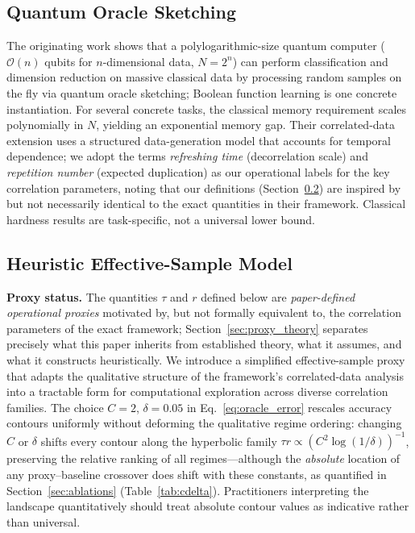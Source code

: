 \documentclass[sensors,article,submit,pdftex,moreauthors]{Definitions/mdpi}
\newcommand{\bigO}{\mathcal{O}}
\providecommand{\DIFadd}[1]{{\protect\color{blue}#1}} %
\providecommand{\DIFdel}[1]{} %
\providecommand{\DIFaddbegin}{} %
\providecommand{\DIFaddend}{} %
\providecommand{\DIFdelbegin}{} %
\providecommand{\DIFdelend}{} %
\begin{document}
\subsection{Quantum Oracle Sketching}

The originating work \citep{zhao2026exponential} shows that a polylogarithmic-size quantum computer ($\bigO(n)$ qubits for $n$-dimensional data, $N = 2^n$) can perform classification and dimension reduction on massive classical data by processing random samples on the fly via quantum oracle sketching; Boolean function learning is one concrete instantiation. For several concrete tasks, the classical memory requirement scales polynomially in $N$, yielding an exponential memory gap. Their correlated-data extension uses a structured data-generation model that accounts for temporal dependence; we adopt the terms \emph{refreshing time} (decorrelation scale) and \emph{repetition number} (expected duplication) as our operational labels for the key correlation parameters, noting that our definitions (Section~\ref{sec:heuristic_model}) are inspired by but not necessarily identical to the exact quantities in their framework. Classical hardness results are task-specific, not a universal lower bound.

\subsection{Heuristic Effective-Sample Model}
\label{sec:heuristic_model}

\textbf{Proxy status.} The quantities $\tau$ and $r$ defined below are \emph{paper-defined operational proxies} motivated by, but not formally equivalent to, the correlation parameters of the exact framework; \DIFdelbegin \DIFdel{equivalence proofs are follow-on work}\DIFdelend \DIFaddbegin \DIFadd{Section~\ref{sec:proxy_theory} separates precisely what this paper inherits from established theory, what it assumes, and what it constructs heuristically}\DIFaddend . We introduce a simplified effective-sample proxy that adapts the qualitative structure of the framework's correlated-data analysis into a tractable form for computational exploration across diverse correlation families. The choice $C{=}2$, $\delta{=}0.05$ in Eq.~\eqref{eq:oracle_error} rescales accuracy contours uniformly without deforming the qualitative regime ordering: changing $C$ or $\delta$ shifts every contour along the hyperbolic family $\tau r \propto (C^2 \log(1/\delta))^{-1}$, preserving the relative ranking of all \DIFdelbegin \DIFdel{regimes}\DIFdelend \DIFaddbegin \DIFadd{regimes---although the }\emph{\DIFadd{absolute}} \DIFadd{location of any proxy--baseline crossover does shift with these constants, as quantified in Section~\ref{sec:ablations} (Table~\ref{tab:cdelta})}\DIFaddend . Practitioners interpreting the landscape quantitatively should treat absolute contour values as indicative rather than universal.
\end{document}
